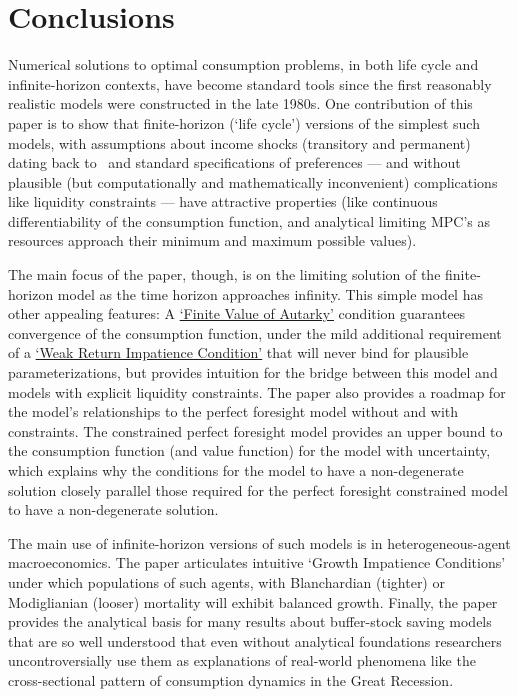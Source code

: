 \documentclass[\econtexRoot/BufferStockTheory]{subfiles}
\begin{document}
\newpage
\hypertarget{Conclusions}{}
\section{Conclusions}

Numerical solutions to optimal consumption problems, in both life cycle and infinite-horizon contexts, have become standard tools since the first reasonably realistic models were constructed in the late 1980s.
One contribution of this paper is to show that finite-horizon (`life cycle') versions of the simplest such models, with assumptions about income shocks (transitory and permanent) dating back to~\cite{friedmanATheory} and standard specifications of preferences --- and without plausible (but computationally and mathematically inconvenient) complications like liquidity constraints --- have attractive properties (like continuous differentiability of the consumption function, and analytical limiting MPC's as resources approach their minimum and maximum possible values).%

The main focus of the paper, though, is on the limiting solution of the finite-horizon model as the time horizon approaches infinity.
This simple model has other appealing features: A \hyperlink{FVAC}{`Finite Value of Autarky'} condition guarantees convergence of the consumption function, under the mild additional requirement of a \hyperlink{WRIC}{`Weak Return Impatience Condition'} that will never bind for plausible parameterizations, but provides intuition for the bridge between this model and models with explicit liquidity constraints.
The paper also provides a roadmap for the model's relationships to the perfect foresight model without and with constraints.
The constrained perfect foresight model provides an upper bound to the consumption function (and value function) for the model with uncertainty, which explains why the conditions for the model to have a non-degenerate solution closely parallel those required for the perfect foresight constrained model to have a non-degenerate solution.

The main use of infinite-horizon versions of such models is in heterogeneous-agent macroeconomics.
The paper articulates intuitive `Growth Impatience Conditions' under which populations of such agents, with Blanchardian (tighter) or Modiglianian (looser) mortality will exhibit balanced growth.
Finally, the paper provides the analytical basis for many results about buffer-stock saving models that are so well understood that even without analytical foundations researchers uncontroversially use them as explanations of real-world phenomena like the cross-sectional pattern of consumption dynamics in the Great Recession.






\end{document}
